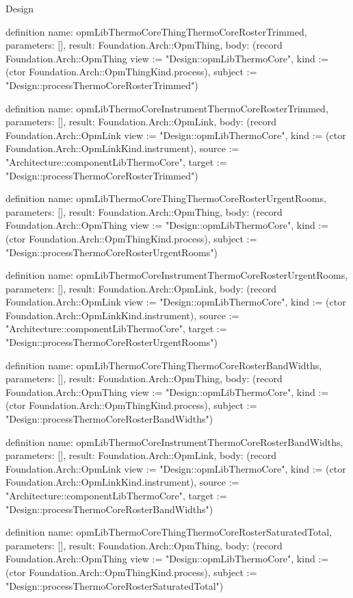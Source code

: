 \begin{lexlean}{Design}
\begin{semanticmodule}
definition{
  name: opmLibThermoCoreThingThermoCoreRosterTrimmed,
  parameters: [],
  result: Foundation.Arch::OpmThing,
  body: (record Foundation.Arch::OpmThing {view := "Design::opmLibThermoCore", kind := (ctor Foundation.Arch::OpmThingKind.process), subject := "Design::processThermoCoreRosterTrimmed"})
}

definition{
  name: opmLibThermoCoreInstrumentThermoCoreRosterTrimmed,
  parameters: [],
  result: Foundation.Arch::OpmLink,
  body: (record Foundation.Arch::OpmLink {view := "Design::opmLibThermoCore", kind := (ctor Foundation.Arch::OpmLinkKind.instrument), source := "Architecture::componentLibThermoCore", target := "Design::processThermoCoreRosterTrimmed"})
}

definition{
  name: opmLibThermoCoreThingThermoCoreRosterUrgentRooms,
  parameters: [],
  result: Foundation.Arch::OpmThing,
  body: (record Foundation.Arch::OpmThing {view := "Design::opmLibThermoCore", kind := (ctor Foundation.Arch::OpmThingKind.process), subject := "Design::processThermoCoreRosterUrgentRooms"})
}

definition{
  name: opmLibThermoCoreInstrumentThermoCoreRosterUrgentRooms,
  parameters: [],
  result: Foundation.Arch::OpmLink,
  body: (record Foundation.Arch::OpmLink {view := "Design::opmLibThermoCore", kind := (ctor Foundation.Arch::OpmLinkKind.instrument), source := "Architecture::componentLibThermoCore", target := "Design::processThermoCoreRosterUrgentRooms"})
}

definition{
  name: opmLibThermoCoreThingThermoCoreRosterBandWidths,
  parameters: [],
  result: Foundation.Arch::OpmThing,
  body: (record Foundation.Arch::OpmThing {view := "Design::opmLibThermoCore", kind := (ctor Foundation.Arch::OpmThingKind.process), subject := "Design::processThermoCoreRosterBandWidths"})
}

definition{
  name: opmLibThermoCoreInstrumentThermoCoreRosterBandWidths,
  parameters: [],
  result: Foundation.Arch::OpmLink,
  body: (record Foundation.Arch::OpmLink {view := "Design::opmLibThermoCore", kind := (ctor Foundation.Arch::OpmLinkKind.instrument), source := "Architecture::componentLibThermoCore", target := "Design::processThermoCoreRosterBandWidths"})
}

definition{
  name: opmLibThermoCoreThingThermoCoreRosterSaturatedTotal,
  parameters: [],
  result: Foundation.Arch::OpmThing,
  body: (record Foundation.Arch::OpmThing {view := "Design::opmLibThermoCore", kind := (ctor Foundation.Arch::OpmThingKind.process), subject := "Design::processThermoCoreRosterSaturatedTotal"})
}


\end{semanticmodule}
\end{lexlean}
